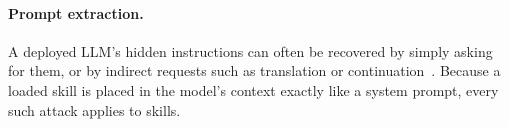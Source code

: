 \paragraph{Prompt extraction.}
A deployed LLM's hidden instructions can often be recovered by simply asking for them, or by
indirect requests such as translation or continuation~\citep{perez2022ignore,zhang2024effective}.
Because a loaded skill is placed in the model's context exactly like a system prompt, every such
attack applies to skills.
